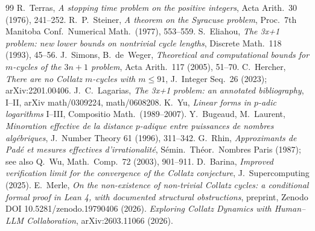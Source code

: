 \documentclass[11pt]{article}
\theoremstyle{remark}
\begin{document}
\begin{thebibliography}{99}
 R.~Terras, \emph{A stopping time problem on the positive integers}, Acta Arith.\ 30 (1976), 241--252.
 R.~P.~Steiner, \emph{A theorem on the Syracuse problem}, Proc.\ 7th Manitoba Conf.\ Numerical Math.\ (1977), 553--559.
 S.~Eliahou, \emph{The 3x+1 problem: new lower bounds on nontrivial cycle lengths}, Discrete Math.\ 118 (1993), 45--56.
 J.~Simons, B.~de~Weger, \emph{Theoretical and computational bounds for $m$-cycles of the $3n+1$ problem}, Acta Arith.\ 117 (2005), 51--70.
 C.~Hercher, \emph{There are no Collatz $m$-cycles with $m \le 91$}, J.\ Integer Seq.\ 26 (2023); arXiv:2201.00406.
 J.~C.~Lagarias, \emph{The 3x+1 problem: an annotated bibliography}, I--II, arXiv math/0309224, math/0608208.
 K.~Yu, \emph{Linear forms in $p$-adic logarithms} I--III, Compositio Math.\ (1989--2007).
 Y.~Bugeaud, M.~Laurent, \emph{Minoration effective de la distance $p$-adique entre puissances de nombres alg\'ebriques}, J.\ Number Theory 61 (1996), 311--342.
 G.~Rhin, \emph{Approximants de Pad\'e et mesures effectives d'irrationalit\'e}, S\'emin.\ Th\'eor.\ Nombres Paris (1987); see also Q.~Wu, Math.\ Comp.\ 72 (2003), 901--911.
 D.~Barina, \emph{Improved verification limit for the convergence of the Collatz conjecture}, J.\ Supercomputing (2025).
 E.~Merle, \emph{On the non-existence of non-trivial Collatz cycles: a conditional formal proof in Lean 4, with documented structural obstructions}, preprint, Zenodo DOI 10.5281/zenodo.19790406 (2026).
 \emph{Exploring Collatz Dynamics with Human--LLM Collaboration}, arXiv:2603.11066 (2026).
\end{thebibliography}
\end{document}
